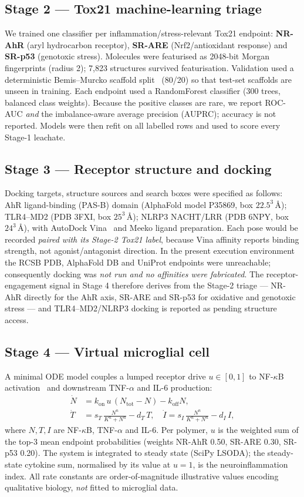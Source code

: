 \documentclass[journal]{IEEEtran}
\begin{document}
\subsection{Stage 2 --- Tox21 machine-learning triage}
We trained one classifier per inflammation/stress-relevant Tox21 endpoint:
\textbf{NR-AhR} (aryl hydrocarbon receptor), \textbf{SR-ARE} (Nrf2/antioxidant
response) and \textbf{SR-p53} (genotoxic stress). Molecules were featurised as
2048-bit Morgan fingerprints (radius 2); 7{,}823 structures survived
featurisation. Validation used a deterministic Bemis--Murcko scaffold
split~\cite{bemis1996} (80/20) so that test-set scaffolds are unseen in training.
Each endpoint used a RandomForest classifier (300 trees, balanced class weights).
Because the positive classes are rare, we report ROC-AUC \emph{and} the
imbalance-aware average precision (AUPRC); accuracy is not reported. Models were
then refit on all labelled rows and used to score every Stage-1 leachate.

\subsection{Stage 3 --- Receptor structure and docking}
Docking targets, structure sources and search boxes were specified as follows:
AhR ligand-binding (PAS-B) domain (AlphaFold model P35869, box $22.5^3$\,\AA);
TLR4--MD2 (PDB 3FXI, box $25^3$\,\AA); NLRP3 NACHT/LRR (PDB 6NPY, box
$24^3$\,\AA), with AutoDock Vina~\cite{trott2010,eberhardt2021} and Meeko ligand
preparation. Each pose would be recorded \emph{paired with its Stage-2 Tox21
label}, because Vina affinity reports binding strength, not agonist/antagonist
direction. In the present execution environment the RCSB PDB, AlphaFold DB and
UniProt endpoints were unreachable; consequently docking was \emph{not run and no
affinities were fabricated}. The receptor-engagement signal in Stage 4 therefore
derives from the Stage-2 triage --- NR-AhR directly for the AhR axis, SR-ARE and
SR-p53 for oxidative and genotoxic stress --- and TLR4--MD2/NLRP3 docking is
reported as pending structure access.

\subsection{Stage 4 --- Virtual microglial cell}
A minimal ODE model couples a lumped receptor drive $u\in[0,1]$ to NF-$\kappa$B
activation~\cite{lawrence2009} and downstream TNF-$\alpha$ and IL-6 production:
\begin{align}
\dot{N} &= k_{\mathrm{on}}\,u\,(N_{\mathrm{tot}}-N) - k_{\mathrm{off}}N,\\
\dot{T} &= s_T\,\frac{N^{n}}{K^{n}+N^{n}} - d_T\,T,\quad
\dot{I} = s_I\,\frac{N^{n}}{K^{n}+N^{n}} - d_I\,I,
\end{align}
where $N,T,I$ are NF-$\kappa$B, TNF-$\alpha$ and IL-6. Per polymer, $u$ is the
weighted sum of the top-3 mean endpoint probabilities (weights NR-AhR 0.50,
SR-ARE 0.30, SR-p53 0.20). The system is integrated to steady state (SciPy
LSODA); the steady-state cytokine sum, normalised by its value at $u=1$, is the
neuroinflammation index. All rate constants are order-of-magnitude illustrative
values encoding qualitative biology, \emph{not} fitted to microglial data.
\end{document}
